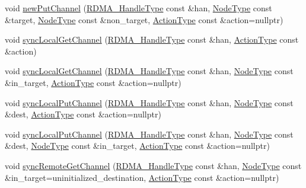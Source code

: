 \begin{DoxyCompactItemize}
\item 
void \hyperlink{structvt_1_1rdma_1_1_r_d_m_a_manager_ae64c8e90dc45fcd44129e4c62f3b65ea}{new\+Put\+Channel} (\hyperlink{namespacevt_a10442579ec4e7ebef223818e64bcf908}{R\+D\+M\+A\+\_\+\+Handle\+Type} const \&han, \hyperlink{namespacevt_a866da9d0efc19c0a1ce79e9e492f47e2}{Node\+Type} const \&target, \hyperlink{namespacevt_a866da9d0efc19c0a1ce79e9e492f47e2}{Node\+Type} const \&non\+\_\+target, \hyperlink{namespacevt_ae0a5a7b18cc99d7b732cb4d44f46b0f3}{Action\+Type} const \&action=nullptr)
\item 
void \hyperlink{structvt_1_1rdma_1_1_r_d_m_a_manager_a85e3bd458484375b762492ed0d65d9f5}{sync\+Local\+Get\+Channel} (\hyperlink{namespacevt_a10442579ec4e7ebef223818e64bcf908}{R\+D\+M\+A\+\_\+\+Handle\+Type} const \&han, \hyperlink{namespacevt_ae0a5a7b18cc99d7b732cb4d44f46b0f3}{Action\+Type} const \&action)
\item 
void \hyperlink{structvt_1_1rdma_1_1_r_d_m_a_manager_aa38b010741db4c375e22662870549dd9}{sync\+Local\+Get\+Channel} (\hyperlink{namespacevt_a10442579ec4e7ebef223818e64bcf908}{R\+D\+M\+A\+\_\+\+Handle\+Type} const \&han, \hyperlink{namespacevt_a866da9d0efc19c0a1ce79e9e492f47e2}{Node\+Type} const \&in\+\_\+target, \hyperlink{namespacevt_ae0a5a7b18cc99d7b732cb4d44f46b0f3}{Action\+Type} const \&action=nullptr)
\item 
void \hyperlink{structvt_1_1rdma_1_1_r_d_m_a_manager_ad09037e1408af7037ca87fc4708700aa}{sync\+Local\+Put\+Channel} (\hyperlink{namespacevt_a10442579ec4e7ebef223818e64bcf908}{R\+D\+M\+A\+\_\+\+Handle\+Type} const \&han, \hyperlink{namespacevt_a866da9d0efc19c0a1ce79e9e492f47e2}{Node\+Type} const \&dest, \hyperlink{namespacevt_ae0a5a7b18cc99d7b732cb4d44f46b0f3}{Action\+Type} const \&action=nullptr)
\item 
void \hyperlink{structvt_1_1rdma_1_1_r_d_m_a_manager_a3b4e56f84f35786f8225baffeaa921ea}{sync\+Local\+Put\+Channel} (\hyperlink{namespacevt_a10442579ec4e7ebef223818e64bcf908}{R\+D\+M\+A\+\_\+\+Handle\+Type} const \&han, \hyperlink{namespacevt_a866da9d0efc19c0a1ce79e9e492f47e2}{Node\+Type} const \&dest, \hyperlink{namespacevt_a866da9d0efc19c0a1ce79e9e492f47e2}{Node\+Type} const \&in\+\_\+target, \hyperlink{namespacevt_ae0a5a7b18cc99d7b732cb4d44f46b0f3}{Action\+Type} const \&action=nullptr)
\item 
void \hyperlink{structvt_1_1rdma_1_1_r_d_m_a_manager_afaa2ab82b754c4a231c3d728fe0a9e88}{sync\+Remote\+Get\+Channel} (\hyperlink{namespacevt_a10442579ec4e7ebef223818e64bcf908}{R\+D\+M\+A\+\_\+\+Handle\+Type} const \&han, \hyperlink{namespacevt_a866da9d0efc19c0a1ce79e9e492f47e2}{Node\+Type} const \&in\+\_\+target=uninitialized\+\_\+destination, \hyperlink{namespacevt_ae0a5a7b18cc99d7b732cb4d44f46b0f3}{Action\+Type} const \&action=nullptr)

\end{DoxyCompactItemize}
